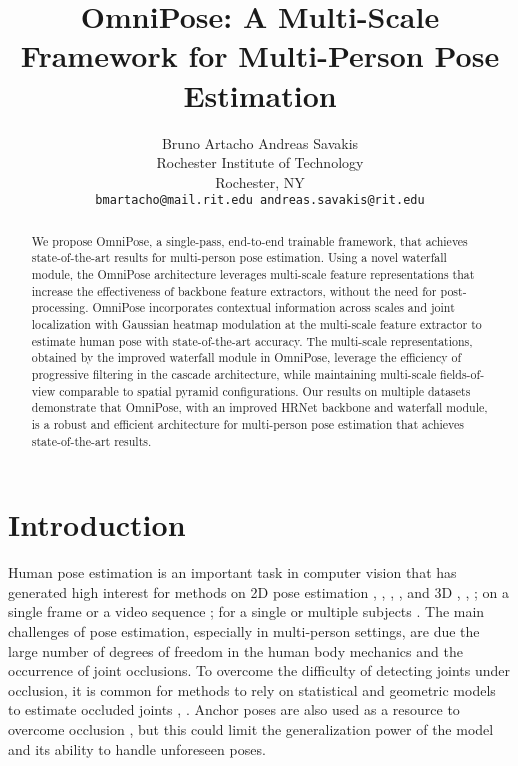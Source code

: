 \documentclass[10pt,twocolumn,letterpaper]{article}
\begin{document}
\title{OmniPose: A Multi-Scale Framework for Multi-Person Pose Estimation}

\author{Bruno Artacho \hspace{2cm} Andreas Savakis \\
Rochester Institute of Technology\\
Rochester, NY\\
{\tt\small bmartacho@mail.rit.edu \hspace{0.5cm} andreas.savakis@rit.edu}}

\maketitle
\ificcvfinal\thispagestyle{empty}\fi

\begin{abstract}
We propose OmniPose, 
a single-pass, end-to-end trainable framework, that achieves state-of-the-art results for multi-person pose estimation. Using a novel waterfall module, the OmniPose architecture leverages multi-scale feature representations that increase the effectiveness of backbone feature extractors, without the need for post-processing. 
OmniPose incorporates contextual information across scales and joint localization with Gaussian heatmap modulation at the multi-scale feature extractor to estimate human pose with state-of-the-art accuracy.
The multi-scale representations, obtained by the improved waterfall module in OmniPose, leverage the efficiency of progressive filtering in the cascade architecture, while maintaining multi-scale fields-of-view comparable to spatial pyramid configurations.
Our results on multiple datasets demonstrate that OmniPose, with an improved HRNet backbone and waterfall module, is a robust and efficient architecture for multi-person pose estimation that achieves state-of-the-art results.
\end{abstract}

\section{Introduction}
Human pose estimation is an important task in computer vision that has generated high interest for  methods on 2D pose estimation \cite{DeepPose}, \cite{HourGlass},
\cite{CPM}, \cite{UniPose},
\cite{HRNet} and 3D \cite{LCR-Net}, \cite{Monocap}, \cite{DensePose}; on a single frame \cite{RecurrentPose} or a video sequence \cite{3D_Video_Occlusion-Aware}; for a single \cite{CPM} or multiple subjects \cite{OpenPose}.
The main challenges of pose estimation, especially in multi-person settings, are due the large number of degrees of freedom in the human body mechanics and the occurrence of joint occlusions.
To overcome the difficulty of detecting joints under occlusion, it is common for methods to rely on statistical and geometric models to estimate occluded joints \cite{GeometricPose}, \cite{StatisticalPose}.
Anchor poses are also used as a resource to overcome occlusion \cite{LCR-Net}, but this could limit the generalization power of the model and its ability to handle unforeseen poses.
\end{document}
